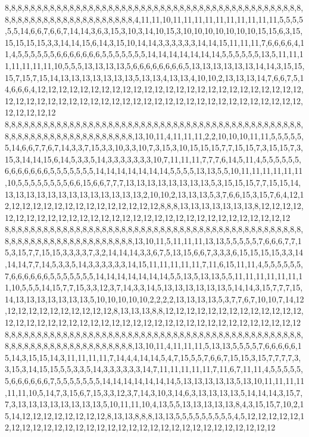 8,8,8,8,8,8,8,8,8,8,8,8,8,8,8,8,8,8,8,8,8,8,8,8,8,8,8,8,8,8,8,8,8,8,8,8,8,8,8,8,8,8,8,8,8,8,8,8,8,8,8,8,8,8,8,8,8,8,8,8,8,8,8,8,8,8,4,11,11,10,11,11,11,11,11,11,11,11,11,11,5,5,5,5,5,5,14,6,6,7,6,6,7,14,14,3,6,3,15,3,10,3,14,10,15,3,10,10,10,10,10,10,10,15,15,6,3,15,15,15,15,15,3,3,14,14,15,6,14,3,15,10,14,14,3,3,3,3,3,3,14,14,15,11,11,11,7,6,6,6,6,4,11,4,5,5,5,5,5,5,6,6,6,6,6,6,6,5,5,5,5,5,5,5,14,14,14,14,14,14,14,5,5,5,5,5,5,13,5,11,11,11,11,11,11,11,10,5,5,5,13,13,13,13,5,6,6,6,6,6,6,6,6,5,13,13,13,13,13,13,14,14,3,15,15,15,7,15,7,15,14,13,13,13,13,13,13,13,5,13,13,4,13,13,4,10,10,2,13,13,13,14,7,6,6,7,5,14,6,6,6,4,12,12,12,12,12,12,12,12,12,12,12,12,12,12,12,12,12,12,12,12,12,12,12,12,12,12,12,12,12,12,12,12,12,12,12,12,12,12,12,12,12,12,12,12,12,12,12,12,12,12,12,12,12,12,12,12,12,12
8,8,8,8,8,8,8,8,8,8,8,8,8,8,8,8,8,8,8,8,8,8,8,8,8,8,8,8,8,8,8,8,8,8,8,8,8,8,8,8,8,8,8,8,8,8,8,8,8,8,8,8,8,8,8,8,8,8,8,8,8,8,8,8,8,8,13,10,11,4,11,11,11,2,2,10,10,10,11,11,5,5,5,5,5,5,14,6,6,7,7,6,7,14,3,3,7,15,3,3,10,3,3,10,7,3,15,3,10,15,15,15,7,7,15,15,7,3,15,15,7,3,15,3,14,14,15,6,14,5,3,3,5,14,3,3,3,3,3,3,3,10,7,11,11,11,7,7,7,6,14,5,11,4,5,5,5,5,5,5,6,6,6,6,6,6,6,5,5,5,5,5,5,5,14,14,14,14,14,14,14,5,5,5,5,13,13,5,5,10,11,11,11,11,11,11,10,5,5,5,5,5,5,5,5,6,6,15,6,6,7,7,7,13,13,13,13,13,13,13,13,5,3,15,15,15,7,7,15,15,14,13,13,13,13,13,13,13,13,13,13,13,13,13,2,10,10,2,13,13,13,5,3,7,6,6,15,3,15,7,6,4,12,12,12,12,12,12,12,12,12,12,12,12,12,12,12,12,8,8,8,13,13,13,13,13,13,13,8,12,12,12,12,12,12,12,12,12,12,12,12,12,12,12,12,12,12,12,12,12,12,12,12,12,12,12,12,12,12,12
8,8,8,8,8,8,8,8,8,8,8,8,8,8,8,8,8,8,8,8,8,8,8,8,8,8,8,8,8,8,8,8,8,8,8,8,8,8,8,8,8,8,8,8,8,8,8,8,8,8,8,8,8,8,8,8,8,8,8,8,8,8,8,8,8,8,13,10,11,5,11,11,11,13,13,5,5,5,5,5,7,6,6,6,7,7,15,3,15,7,7,15,15,3,3,3,3,7,3,2,14,14,14,3,3,6,7,5,13,15,6,6,7,3,3,3,6,15,15,15,15,3,3,14,14,14,7,7,14,5,3,3,5,14,3,3,3,3,3,3,14,15,11,11,11,11,11,7,11,6,15,11,11,4,5,5,5,5,5,5,7,6,6,6,6,6,6,5,5,5,5,5,5,5,14,14,14,14,14,14,14,5,5,13,5,13,13,5,5,11,11,11,11,11,11,11,10,5,5,5,14,15,7,7,15,3,3,12,3,7,14,3,3,14,5,13,13,13,13,13,13,5,14,14,3,15,7,7,7,15,14,13,13,13,13,13,13,13,5,10,10,10,10,10,2,2,2,2,13,13,13,13,5,3,7,7,6,7,10,10,7,14,12,12,12,12,12,12,12,12,12,12,12,8,13,13,13,8,8,12,12,12,12,12,12,12,12,12,12,12,12,12,12,12,12,12,12,12,12,12,12,12,12,12,12,12,12,12,12,12,12,12,12,12,12,12,12,12,12,12
8,8,8,8,8,8,8,8,8,8,8,8,8,8,8,8,8,8,8,8,8,8,8,8,8,8,8,8,8,8,8,8,8,8,8,8,8,8,8,8,8,8,8,8,8,8,8,8,8,8,8,8,8,8,8,8,8,8,8,8,8,8,8,8,8,8,13,10,11,4,11,11,11,5,13,13,5,5,5,5,7,6,6,6,6,6,15,14,3,15,15,14,3,11,11,11,11,7,14,4,4,14,14,5,4,7,15,5,5,7,6,6,7,15,15,3,15,7,7,7,7,3,3,15,3,14,15,15,5,5,3,3,5,14,3,3,3,3,3,3,14,7,11,11,11,11,11,7,11,6,7,11,11,4,5,5,5,5,5,5,6,6,6,6,6,6,7,5,5,5,5,5,5,5,14,14,14,14,14,14,14,5,13,13,13,13,13,5,13,10,11,11,11,11,11,11,10,5,14,7,3,15,6,7,15,3,3,12,3,7,14,3,10,3,14,6,3,13,13,13,13,5,14,14,14,3,15,7,7,3,13,13,13,13,13,13,13,13,5,10,11,11,10,4,13,5,5,13,13,13,13,13,8,4,3,15,15,7,10,2,15,14,12,12,12,12,12,12,12,12,8,13,13,8,8,8,13,13,5,5,5,5,5,5,5,5,5,4,5,12,12,12,12,12,12,12,12,12,12,12,12,12,12,12,12,12,12,12,12,12,12,12,12,12,12,12,12,12,12,12
